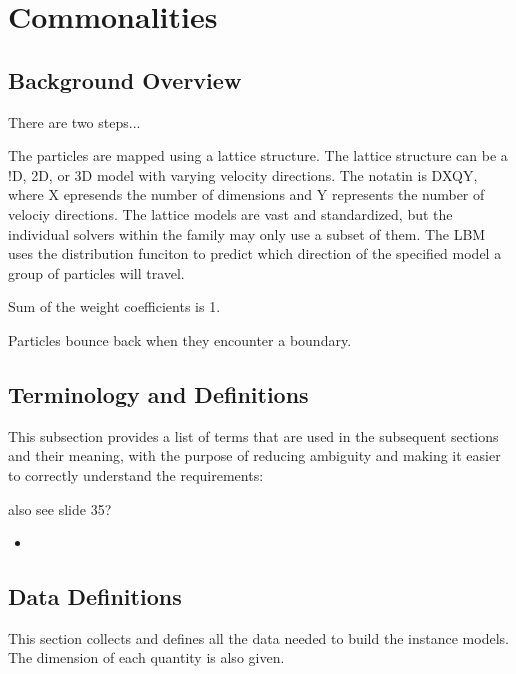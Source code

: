 \documentclass[12pt]{article}
\begin{document}
\section{Commonalities}

\subsection{Background Overview} \label{Sec_Background}

There are two steps...

The particles are mapped using a lattice structure. The lattice structure can be a !D, 2D, or 3D model with varying velocity directions. The notatin is DXQY, where X epresends the number of dimensions and Y represents the number of velociy directions. The lattice models are vast and standardized, but the individual solvers within the family may only use a subset of them. The LBM uses the distribution funciton to predict which direction of the specified model a group of particles will travel.

Sum of the weight coefficients is 1. 

Particles bounce back when they encounter a boundary.

\subsection{Terminology and  Definitions}

This subsection provides a list of terms that are used in the subsequent
sections and their meaning, with the purpose of reducing ambiguity and making it
easier to correctly understand the requirements:


also see slide 35?

\begin{itemize}

\item 

\end{itemize}

\subsection{Data Definitions} \label{sec_datadef}

This section collects and defines all the data needed to build the instance
models. The dimension of each quantity is also given.  
\end{document}
